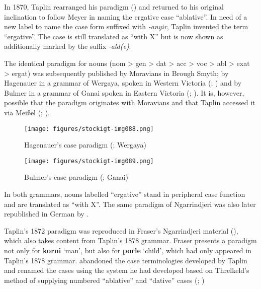 In 1870, Taplin rearranged his paradigm () and returned to his original inclination to follow Meyer in naming the ergative case “ablative''. In need of a new label to name the case form suffixed with \textit{{}-anyir}, Taplin invented the term “ergative''. The case is still translated as “with X” but is now shown as additionally marked by the suffix \textit{{}-ald(e)}.

The identical paradigm for nouns (nom > gen > dat > acc > voc > abl > exat > ergat) was subsequently published by Moravians in Brough Smyth; by Hagenauer in a grammar of Wergaya, spoken in Western Victoria (\citeyear[43]{hagenauer_language_1878}; ) and by Bulmer in a grammar of Ganai spoken in Eastern Victoria (\citeyear[31]{hagenauer_language_1878}; ). It is, however, possible that the paradigm originates with Moravians and that Taplin accessed it via Meißel (; ).

\begin{figure}
\texttt{[image: figures/stockigt-img088.png]}
\caption{Hagenauer’s case paradigm (\citeyear[43]{hagenauer_language_1878}; Wergaya)}
\label{bkm:Ref456016978}\label{fig:key:7-142}
\end{figure}

\begin{figure}
\texttt{[image: figures/stockigt-img089.png]}
\caption{Bulmer’s case paradigm (\citeyear[31]{bulmer_language_1878}; Ganai)}
\label{bkm:Ref456016988}\label{fig:key:7-143}
\end{figure}

In both grammars, nouns labelled “ergative” stand in peripheral case function and are translated as ``with X''. The same paradigm of Ngarrindjeri was also later republished in German by \citet[92]{eylmann_eingeborenen_1908}.


Taplin’s 1872 paradigm was reproduced in Fraser’s Ngarrindjeri material (\citeyear{fraser_australian_1892}), which also takes content from Taplin’s 1878 grammar. Fraser presents a paradigm not only for \textbf{korni} `man’, but also for \textbf{porle} `child’, which had only appeared in Taplin’s 1878 grammar. \citet[30--32]{fraser_australian_1892} abandoned the case terminologies developed by Taplin and renamed the cases using the system he had developed based on Threlkeld’s method of supplying numbered “ablative” and “dative” cases (; )


